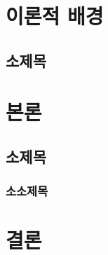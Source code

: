 \section{이론적 배경}

\subsection{소제목}


\section{본론}

\subsection{소제목}

\subsubsection{소소제목}


\section{결론}
